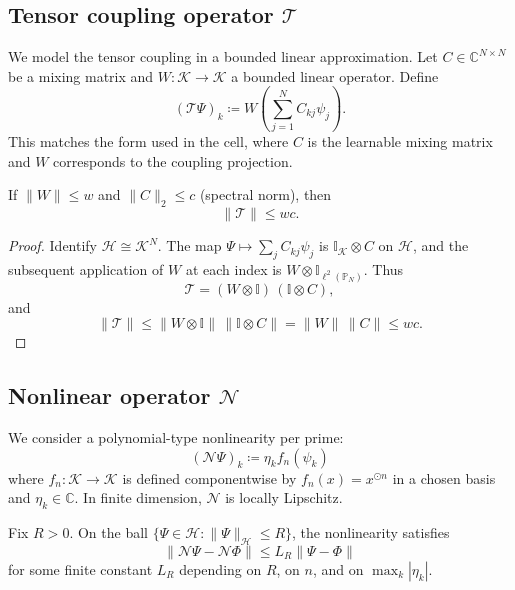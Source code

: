 \documentclass[11pt]{article}
\begin{document}
\subsection{Tensor coupling operator \(\mathcal{T}\)}

We model the tensor coupling in a bounded linear approximation. Let \(C\in\mathbb{C}^{N\times N}\) be a mixing matrix and \(W:\mathcal{K}\to\mathcal{K}\) a bounded linear operator. Define
\begin{equation}
(\mathcal{T}\Psi)_k \coloneqq W\left(\sum_{j=1}^N C_{kj}\psi_j\right).
\end{equation}
This matches the form used in the cell, where \(C\) is the learnable mixing matrix and \(W\) corresponds to the coupling projection.

\begin{lemma}
\label{lem:T-norm}
If \(\|W\|\le w\) and \(\|C\|_2\le c\) (spectral norm), then
\[
\|\mathcal{T}\|\le wc.
\]
\end{lemma}

\begin{proof}
Identify \(\mathcal{H}\cong \mathcal{K}^N\). The map \(\Psi\mapsto \sum_j C_{kj}\psi_j\) is \(\mathbb{I}_{\mathcal{K}}\otimes C\) on \(\mathcal{H}\), and the subsequent application of \(W\) at each index is \(W\otimes \mathbb{I}_{\ell^2(\mathbb{P}_N)}\). Thus
\[
\mathcal{T} = (W\otimes \mathbb{I})\,(\mathbb{I}\otimes C),
\]
and
\[
\|\mathcal{T}\|
\le
\|W\otimes \mathbb{I}\|\,\|\mathbb{I}\otimes C\|
=
\|W\|\,\|C\|
\le wc.
\]
\end{proof}

\subsection{Nonlinear operator \(\mathcal{N}\)}

We consider a polynomial-type nonlinearity per prime:
\begin{equation}
(\mathcal{N}\Psi)_k
\coloneqq
\eta_k f_n(\psi_k)
\end{equation}
where \(f_n:\mathcal{K}\to\mathcal{K}\) is defined componentwise by \(f_n(x)=x^{\odot n}\) in a chosen basis and \(\eta_k\in\mathbb{C}\). In finite dimension, \(\mathcal{N}\) is locally Lipschitz.

\begin{lemma}
\label{lem:N-local}
Fix \(R>0\). On the ball \(\{\Psi\in\mathcal{H} : \|\Psi\|_{\mathcal{H}}\le R\}\), the nonlinearity satisfies
\[
\|\mathcal{N}\Psi - \mathcal{N}\Phi\|
\le
L_R \|\Psi - \Phi\|
\]
for some finite constant \(L_R\) depending on \(R\), on \(n\), and on \(\max_k|\eta_k|\).
\end{lemma}
\end{document}
